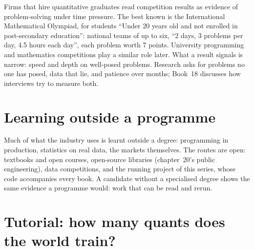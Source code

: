 Firms that hire quantitative graduates read competition results as evidence of problem-solving under time pressure. The
best known is the International Mathematical Olympiad, for students ``Under 20 years old and not enrolled in
post-secondary education'': national teams of up to six, ``2 days, 3 problems per day, 4.5 hours each day'', each problem
worth 7 points. University programming and mathematics competitions play a similar role later. What a result signals is
narrow: speed and depth on well-posed problems. Research asks for problems no one has posed, data that lie, and patience
over months; Book~18 discusses how interviews try to measure both.

\section{Learning outside a programme}

Much of what the industry uses is learnt outside a degree: programming in production, statistics on real data, the
markets themselves. The routes are open: textbooks and open courses, open-source libraries (chapter~20's public
engineering), data competitions, and the running project of this series, whose code accompanies every book. A candidate
without a specialised degree shows the same evidence a programme would: work that can be read and rerun.

\section{Tutorial: how many quants does the world train?}\label{tut:in:education-pipelines:tut}

